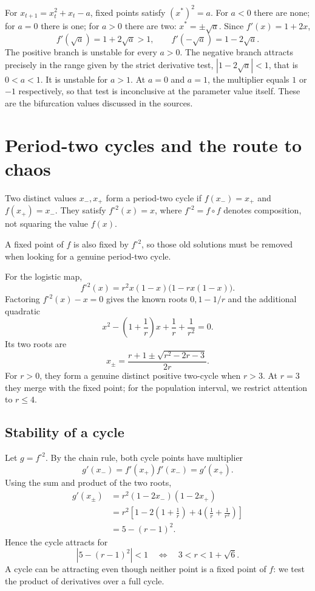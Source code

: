 \begin{example}
For $x_{t+1}=x_t^2+x_t-a$, fixed points satisfy $(x^*)^2=a$.
For $a<0$ there are none; for $a=0$ there is one; for $a>0$ there are two:
$x^*=\pm\sqrt a$. Since $f'(x)=1+2x$,
\[
f'(\sqrt a)=1+2\sqrt a>1,\qquad
f'(-\sqrt a)=1-2\sqrt a.
\]
The positive branch is unstable for every $a>0$. The negative branch
attracts precisely in the range given by the strict derivative test,
$|1-2\sqrt a|<1$, that is $0<a<1$. It is unstable for $a>1$.
At $a=0$ and $a=1$, the multiplier equals $1$ or $-1$ respectively,
so that test is inconclusive at the parameter value itself.
These are the bifurcation values discussed in the sources.
\end{example}

\section{Period-two cycles and the route to chaos}
\begin{definition}
Two distinct values $x_-,x_+$ form a period-two cycle if
$f(x_-)=x_+$ and $f(x_+)=x_-$. They satisfy
$f^{\circ2}(x)=x$, where $f^{\circ2}=f\circ f$ denotes composition, not
squaring the value $f(x)$.
\end{definition}
A fixed point of $f$ is also fixed by $f^{\circ2}$, so those old solutions
must be removed when looking for a genuine period-two cycle.

For the logistic map,
\[
f^{\circ2}(x)=r^2x(1-x)\bigl(1-rx(1-x)\bigr).
\]
Factoring $f^{\circ2}(x)-x=0$ gives the known roots $0,1-1/r$ and the
additional quadratic
\[
x^2-\left(1+\frac1r\right)x+\frac1r+\frac1{r^2}=0.
\]
Its two roots are
\begin{equation}\label{eq:applied-two-cycle}
x_\pm=\frac{r+1\pm\sqrt{r^2-2r-3}}{2r}.
\end{equation}
For $r>0$, they form a genuine distinct positive two-cycle when $r>3$.
At $r=3$ they merge with the fixed point; for the population interval,
we restrict attention to $r\leq4$.

\subsection{Stability of a cycle}
Let $g=f^{\circ2}$. By the chain rule, both cycle points have multiplier
\[
g'(x_-)=f'(x_+)f'(x_-)=g'(x_+).
\]
Using the sum and product of the two roots,
\begin{align*}
g'(x_\pm)
&=r^2(1-2x_-)(1-2x_+)\\
&=r^2\left[1-2\left(1+\frac1r\right)
+4\left(\frac1r+\frac1{r^2}\right)\right]\\
&=5-(r-1)^2.
\end{align*}
Hence the cycle attracts for
\[
|5-(r-1)^2|<1\quad\Longleftrightarrow\quad3<r<1+\sqrt6.
\]
A cycle can be attracting even though neither point is a fixed point of $f$:
we test the product of derivatives over a full cycle.

